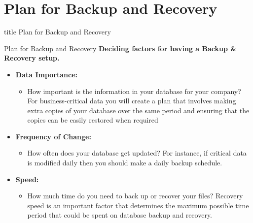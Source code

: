 \documentclass[aspectratio=169, xcolor=dvipsnames]{beamer}
\begin{document}
\section{Plan for Backup and Recovery}

\begin{frame}
  \vfill
  \centering
  \begin{beamercolorbox}[sep=8pt,center,shadow=true,rounded=true]{title}
    Plan for Backup and Recovery\par%
  \end{beamercolorbox}
  \vfill
\end{frame}

\begin{frame}{Plan for Backup and Recovery}
    \textbf{Deciding factors for having a Backup \& Recovery setup.}
    \begin{itemize}[<+->]
        \item \textbf{Data Importance:}
        \begin{itemize}
            \item[$\triangleright$] How important is the information in your database for your company? For business-critical data you will create a plan that involves making extra copies of your database over the same period and ensuring that the copies can be easily restored when required
        \end{itemize}
        \item \textbf{Frequency of Change:}
        \begin{itemize}
            \item[$\triangleright$] How often does your database get updated? For instance, if critical data is modified daily then you should make a daily backup schedule.
        \end{itemize}
        \item \textbf{Speed:}
        \begin{itemize}
            \item[$\triangleright$] How much time do you need to back up or recover your files? Recovery speed is an important factor that determines the maximum possible time period that could be spent on database backup and recovery.
        \end{itemize}
    \end{itemize}
\end{frame}
\end{document}
